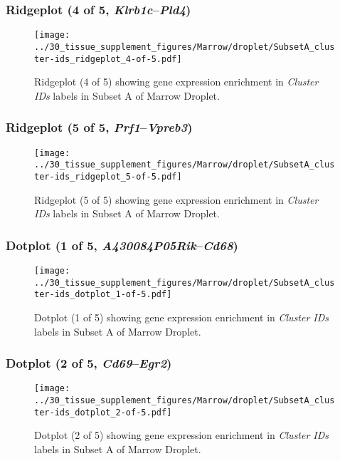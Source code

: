 \clearpage

\subsubsection{Ridgeplot (4 of 5, \emph{Klrb1c}--\emph{Pld4})}
\begin{figure}[h]
\centering
\texttt{[image: ../30\_tissue\_supplement\_figures/Marrow/droplet/SubsetA\_cluster-ids\_ridgeplot\_4-of-5.pdf]}

\caption{ Ridgeplot (4 of 5)  showing gene expression enrichment in \emph{Cluster IDs} labels in Subset A of Marrow Droplet. }
\end{figure}


\clearpage

\subsubsection{Ridgeplot (5 of 5, \emph{Prf1}--\emph{Vpreb3})}
\begin{figure}[h]
\centering
\texttt{[image: ../30\_tissue\_supplement\_figures/Marrow/droplet/SubsetA\_cluster-ids\_ridgeplot\_5-of-5.pdf]}

\caption{ Ridgeplot (5 of 5)  showing gene expression enrichment in \emph{Cluster IDs} labels in Subset A of Marrow Droplet. }
\end{figure}


\clearpage

\subsubsection{Dotplot (1 of 5, \emph{A430084P05Rik}--\emph{Cd68})}
\begin{figure}[h]
\centering
\texttt{[image: ../30\_tissue\_supplement\_figures/Marrow/droplet/SubsetA\_cluster-ids\_dotplot\_1-of-5.pdf]}

\caption{ Dotplot (1 of 5)  showing gene expression enrichment in \emph{Cluster IDs} labels in Subset A of Marrow Droplet. }
\end{figure}


\clearpage

\subsubsection{Dotplot (2 of 5, \emph{Cd69}--\emph{Egr2})}
\begin{figure}[h]
\centering
\texttt{[image: ../30\_tissue\_supplement\_figures/Marrow/droplet/SubsetA\_cluster-ids\_dotplot\_2-of-5.pdf]}

\caption{ Dotplot (2 of 5)  showing gene expression enrichment in \emph{Cluster IDs} labels in Subset A of Marrow Droplet. }
\end{figure}


